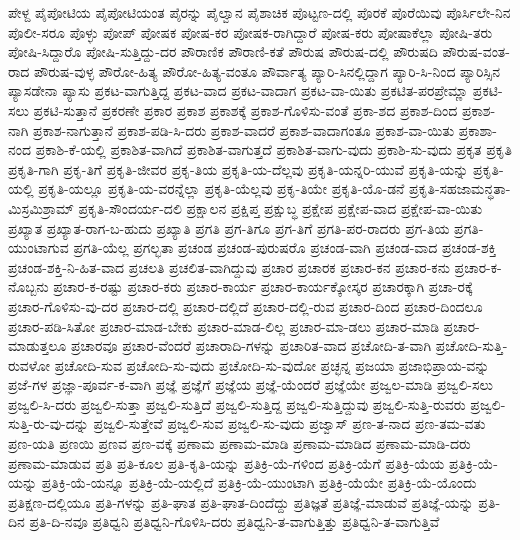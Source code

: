ಪೇಳ್ದ
ಪೈಪೋಟಿಯ
ಪೈಪೋಟಿಯಂತ
ಪೈರನ್ನು
ಪೈಲ್ವಾನ
ಪೈಶಾಚಿಕ
ಪೊಟ್ಟಣ-ದಲ್ಲಿ
ಪೊರಕೆ
ಪೊರೆಯಿವು
ಪೊರ್ಸಿಲೇ-ನಿನ
ಪೊಲೀ-ಸರೂ
ಪೊಳ್ಳು
ಪೋಪ್
ಪೋಷಕ
ಪೋಷ-ಕರ
ಪೋಷಕ-ರಾಗಿದ್ದಾರೆ
ಪೋಷ-ಕರು
ಪೋಷಾಕೆಲ್ಲಾ
ಪೋಷಿ-ತರು
ಪೋಷಿ-ಸಿದ್ದಾರೊ
ಪೋಷಿ-ಸುತ್ತಿದ್ದು-ದರ
ಪೌರಾಣಿಕ
ಪೌರಾಣಿ-ಕತೆ
ಪೌರುಷ
ಪೌರುಷ-ದಲ್ಲಿ
ಪೌರುಷದಿ
ಪೌರುಷ-ವಂತ-ರಾದ
ಪೌರುಷ-ವುಳ್ಳ
ಪೌರೋ-ಹಿತ್ಯ
ಪೌರೋ-ಹಿತ್ಯ-ವಂತೂ
ಪೌರ್ವಾತ್ಯ
ಪ್ಯಾರಿ-ಸಿನಲ್ಲಿದ್ದಾಗ
ಪ್ಯಾರಿ-ಸಿ-ನಿಂದ
ಪ್ಯಾರಿಸ್ಸಿನ
ಪ್ಯಾಸಡೇನಾ
ಪ್ಯಾಸು
ಪ್ರಕಟ-ವಾಗುತ್ತಿದ್ದ
ಪ್ರಕಟ-ವಾದ
ಪ್ರಕಟ-ವಾದಾಗ
ಪ್ರಕಟ-ವಾ-ಯಿತು
ಪ್ರಕಟಿತ-ಪರಪ್ರೇಮ್ಣಾ
ಪ್ರಕಟಿ-ಸಲು
ಪ್ರಕಟಿ-ಸುತ್ತಾನೆ
ಪ್ರಕರಣೇ
ಪ್ರಕಾರ
ಪ್ರಕಾಶ
ಪ್ರಕಾಶಕ್ಕೆ
ಪ್ರಕಾಶ-ಗೊಳಿಸು-ವಂತೆ
ಪ್ರಕಾ-ಶದ
ಪ್ರಕಾಶ-ದಿಂದ
ಪ್ರಕಾಶ-ನಾಗಿ
ಪ್ರಕಾಶ-ನಾಗುತ್ತಾನೆ
ಪ್ರಕಾಶ-ಪಡಿ-ಸಿ-ದರು
ಪ್ರಕಾಶ-ವಾದರೆ
ಪ್ರಕಾಶ-ವಾದಾಗಂತೂ
ಪ್ರಕಾಶ-ವಾ-ಯಿತು
ಪ್ರಕಾಶಾ-ನಂದ
ಪ್ರಕಾಶಿ-ಕೆ-ಯಲ್ಲಿ
ಪ್ರಕಾಶಿತ-ವಾಗಿದೆ
ಪ್ರಕಾಶಿತ-ವಾಗುತ್ತದೆ
ಪ್ರಕಾಶಿತ-ವಾಗು-ವುದು
ಪ್ರಕಾಶಿ-ಸು-ವುದು
ಪ್ರಕೃತ
ಪ್ರಕೃತಿ
ಪ್ರಕೃತಿ-ಗಾಗಿ
ಪ್ರಕೃ-ತಿಗೆ
ಪ್ರಕೃತಿ-ಜೀವರ
ಪ್ರಕೃ-ತಿಯ
ಪ್ರಕೃತಿ-ಯ-ದೆಲ್ಲವು
ಪ್ರಕೃತಿ-ಯನ್ನರಿ-ಯುವೆ
ಪ್ರಕೃತಿ-ಯನ್ನು
ಪ್ರಕೃತಿ-ಯಲ್ಲಿ
ಪ್ರಕೃತಿ-ಯಲ್ಲೂ
ಪ್ರಕೃತಿ-ಯ-ವರನ್ನೆಲ್ಲಾ
ಪ್ರಕೃತಿ-ಯೆಲ್ಲವು
ಪ್ರಕೃ-ತಿಯೇ
ಪ್ರಕೃತಿ-ಯೊ-ಡನೆ
ಪ್ರಕೃತಿ-ಸಹಜಾಮನ್ಧತಾ-ಮಿಸ್ರಮಿಶ್ರಾಮ್
ಪ್ರಕೃತಿ-ಸೌಂದರ್ಯ-ದಲಿ
ಪ್ರಕ್ಷಾಲನ
ಪ್ರಕ್ಷಿಪ್ತ
ಪ್ರಕ್ಷುಬ್ಧ
ಪ್ರಕ್ಷೇಪ
ಪ್ರಕ್ಷೇಪ-ವಾದ
ಪ್ರಕ್ಷೇಪ-ವಾ-ಯಿತು
ಪ್ರಖ್ಯಾತ
ಪ್ರಖ್ಯಾತ-ರಾಗ-ಬ-ಹುದು
ಪ್ರಖ್ಯಾತಿ
ಪ್ರಗತಿ
ಪ್ರಗ-ತಿಗೂ
ಪ್ರಗ-ತಿಗೆ
ಪ್ರಗತಿ-ಪರ-ರಾದರು
ಪ್ರಗ-ತಿಯ
ಪ್ರಗತಿ-ಯುಂಟಾಗುವ
ಪ್ರಗತಿ-ಯೆಲ್ಲ
ಪ್ರಗಲ್ಭತಾ
ಪ್ರಚಂಡ
ಪ್ರಚಂಡ-ಪುರುಷರೊ
ಪ್ರಚಂಡ-ವಾಗಿ
ಪ್ರಚಂಡ-ವಾದ
ಪ್ರಚಂಡ-ಶಕ್ತಿ
ಪ್ರಚಂಡ-ಶಕ್ತಿ-ನಿ-ಹಿತ-ವಾದ
ಪ್ರಚಲತಿ
ಪ್ರಚಲಿತ-ವಾಗಿದ್ದುವು
ಪ್ರಚಾರ
ಪ್ರಚಾರಕ
ಪ್ರಚಾರ-ಕನ
ಪ್ರಚಾರ-ಕನು
ಪ್ರಚಾರ-ಕ-ನೊಬ್ಬನು
ಪ್ರಚಾರ-ಕ-ರಷ್ಟು
ಪ್ರಚಾರ-ಕರು
ಪ್ರಚಾರ-ಕಾರ್ಯ
ಪ್ರಚಾರ-ಕಾರ್ಯಕ್ಕೋಸ್ಕರ
ಪ್ರಚಾರಕ್ಕಾಗಿ
ಪ್ರಚಾ-ರಕ್ಕೆ
ಪ್ರಚಾರ-ಗೊಳಿಸು-ವು-ದರ
ಪ್ರಚಾರ-ದಲ್ಲಿ
ಪ್ರಚಾರ-ದಲ್ಲಿದೆ
ಪ್ರಚಾರ-ದಲ್ಲಿ-ರುವ
ಪ್ರಚಾರ-ದಿಂದ
ಪ್ರಚಾರ-ದಿಂದಲೂ
ಪ್ರಚಾರ-ಪಡಿ-ಸಿತೋ
ಪ್ರಚಾರ-ಮಾಡ-ಬೇಕು
ಪ್ರಚಾರ-ಮಾಡ-ಲಿಲ್ಲ
ಪ್ರಚಾರ-ಮಾ-ಡಲು
ಪ್ರಚಾರ-ಮಾಡಿ
ಪ್ರಚಾರ-ಮಾಡುತ್ತಲೂ
ಪ್ರಚಾರವೂ
ಪ್ರಚಾರ-ವೆಂದರೆ
ಪ್ರಚಾರಾದಿ-ಗಳನ್ನು
ಪ್ರಚಾರಿತ-ವಾದ
ಪ್ರಚೋದಿ-ತ-ವಾಗಿ
ಪ್ರಚೋದಿ-ಸುತ್ತಿ-ರುವಳೋ
ಪ್ರಚೋದಿ-ಸುವ
ಪ್ರಚೋದಿ-ಸು-ವುದು
ಪ್ರಚೋದಿ-ಸು-ವುದೋ
ಪ್ರಚ್ಛನ್ನ
ಪ್ರಜಯಾ
ಪ್ರಜಾಭಿಪ್ರಾಯ-ವನ್ನು
ಪ್ರಜೆ-ಗಳ
ಪ್ರಜ್ಞಾ-ಪೂರ್ವ-ಕ-ವಾಗಿ
ಪ್ರಜ್ಞೆ
ಪ್ರಜ್ಞೆಗೆ
ಪ್ರಜ್ಞೆಯ
ಪ್ರಜ್ಞೆ-ಯೆಂದರೆ
ಪ್ರಜ್ಞೆಯೇ
ಪ್ರಜ್ವಲ-ಮಾಡಿ
ಪ್ರಜ್ವಲಿ-ಸಲು
ಪ್ರಜ್ವಲಿ-ಸಿ-ದರು
ಪ್ರಜ್ವಲಿ-ಸುತ್ತಾ
ಪ್ರಜ್ವಲಿ-ಸುತ್ತಿದೆ
ಪ್ರಜ್ವಲಿ-ಸುತ್ತಿದ್ದ
ಪ್ರಜ್ವಲಿ-ಸುತ್ತಿದ್ದುವು
ಪ್ರಜ್ವಲಿ-ಸುತ್ತಿ-ರುವರು
ಪ್ರಜ್ವಲಿ-ಸುತ್ತಿ-ರು-ವು-ದನ್ನು
ಪ್ರಜ್ವಲಿ-ಸುತ್ತೇವೆ
ಪ್ರಜ್ವಲಿ-ಸುವ
ಪ್ರಜ್ವಲಿ-ಸು-ವುದು
ಪ್ರಜ್ವಾಸ್
ಪ್ರಣ-ತ-ನಾದ
ಪ್ರಣ-ತಮ-ವತು
ಪ್ರಣ-ಯತಿ
ಪ್ರಣಯಿ
ಪ್ರಣವ
ಪ್ರಣ-ವಕ್ಕೆ
ಪ್ರಣಾಮ
ಪ್ರಣಾಮ-ಮಾಡಿ
ಪ್ರಣಾಮ-ಮಾಡಿದ
ಪ್ರಣಾಮ-ಮಾಡಿ-ದರು
ಪ್ರಣಾಮ-ಮಾಡುವ
ಪ್ರತಿ
ಪ್ರತಿ-ಕೂಲ
ಪ್ರತಿ-ಕೃತಿ-ಯನ್ನು
ಪ್ರತಿಕ್ರಿ-ಯೆ-ಗಳಿಂದ
ಪ್ರತಿಕ್ರಿ-ಯೆಗೆ
ಪ್ರತಿಕ್ರಿ-ಯೆಯ
ಪ್ರತಿಕ್ರಿ-ಯೆ-ಯನ್ನು
ಪ್ರತಿಕ್ರಿ-ಯೆ-ಯನ್ನೂ
ಪ್ರತಿಕ್ರಿ-ಯೆ-ಯಲ್ಲಿದೆ
ಪ್ರತಿಕ್ರಿ-ಯೆ-ಯುಂಟಾಗಿ
ಪ್ರತಿಕ್ರಿ-ಯೆಯೇ
ಪ್ರತಿಕ್ರಿ-ಯೆ-ಯೊಂದು
ಪ್ರತಿಕ್ಷಣ-ದಲ್ಲಿಯೂ
ಪ್ರತಿ-ಗಳನ್ನು
ಪ್ರತಿ-ಘಾತ
ಪ್ರತಿ-ಘಾತ-ದಿಂದೆದ್ದು
ಪ್ರತಿಜ್ಞತೆ
ಪ್ರತಿಜ್ಞೆ-ಮಾಡುವೆ
ಪ್ರತಿಜ್ಞೆ-ಯನ್ನು
ಪ್ರತಿ-ದಿನ
ಪ್ರತಿ-ದಿ-ನವೂ
ಪ್ರತಿಧ್ವನಿ
ಪ್ರತಿಧ್ವನಿ-ಗೊಳಿಸಿ-ದರು
ಪ್ರತಿಧ್ವನಿ-ತ-ವಾಗುತ್ತಿತ್ತು
ಪ್ರತಿಧ್ವನಿ-ತ-ವಾಗುತ್ತಿವೆ
